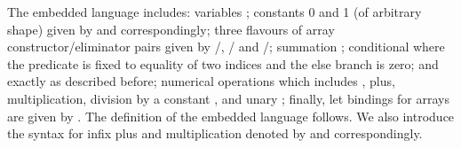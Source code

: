 The embedded language  includes: variables ; constants 0 and 1
(of arbitrary shape) given by  and  correspondingly; three
flavours of array constructor/eliminator pairs given by /,
/ and /; summation ; conditional
 where the predicate is fixed to equality of two indices and the
else branch is zero;  and  exactly as described before;
numerical operations which includes , plus,
multiplication, division by a constant , and unary ;
finally, let bindings for arrays are given by .
The definition of the embedded language  follows.  We also introduce the
syntax for infix plus and multiplication denoted by  and 
correspondingly.
